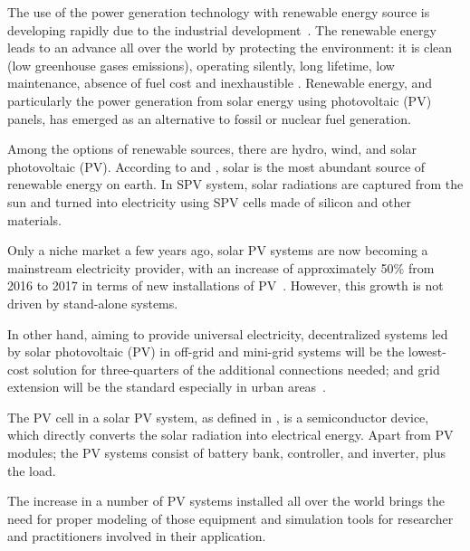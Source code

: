 The use of the power generation technology with renewable energy source is developing rapidly due to the industrial development~\cite{Yatimi}. The renewable energy leads to an advance all over the world by protecting the environment: it is clean (low greenhouse gases emissions), operating silently, long lifetime, low maintenance, absence of fuel cost and inexhaustible \cite{Noroozian}. Renewable energy, and particularly the power generation from solar energy using photovoltaic (PV) panels, has emerged as an alternative to fossil or nuclear fuel generation. 

Among the options of renewable sources, there are hydro, wind, and solar photovoltaic (PV). According to \cite{SEIA} and \cite{Chauhan}, solar is the most abundant source of renewable energy on earth. In SPV system, solar radiations are captured from the sun and turned into electricity using SPV cells made of silicon and other materials.

Only a niche market a few years ago, solar PV systems are now becoming a mainstream electricity provider, with an increase of approximately 50\% from 2016 to 2017 in terms of new installations of PV~\cite{EPIA}. However, this growth is not driven by stand-alone systems.

In other hand, aiming to provide universal electricity, decentralized systems led by solar photovoltaic (PV) in off-grid and mini-grid systems will be the lowest-cost solution for three-quarters of the additional connections needed; and grid extension will be the standard especially in urban areas~\cite{IEAweo2018}.

The PV cell in a solar PV system, as defined in \cite{Rawat}, is a semiconductor device, which directly converts the solar radiation into electrical energy. Apart from PV modules; the PV systems consist of battery bank, controller, and inverter, plus the load.
%
%

The increase in a number of PV systems installed all over the world brings the need for proper modeling of those equipment and simulation tools for researcher and practitioners involved in their application. 

